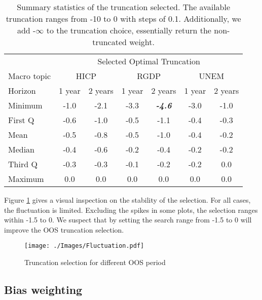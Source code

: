 \documentclass[11pt]{article}
\begin{document}
\begin{table}[!h]
\centering
\caption{Summary statistics of the truncation selected. The available truncation ranges from -10 to 0 with steps of 0.1. Additionally, we add -$\infty$ to the truncation choice, essentially return the non-truncated weight.}
\label{tab: truncation summary statistics}
\begin{tabular}{lcccccc}%
\hline
&\multicolumn{6}{c}{Selected Optimal Truncation}\\
\cmidrule(lr){2-7}
Macro topic & \multicolumn{2}{c}{HICP} & \multicolumn{2}{c}{RGDP} & \multicolumn{2}{c}{UNEM} \\
\cmidrule(lr){2-3} \cmidrule(lr){4-5}\cmidrule(lr){6-7}
Horizon     & 1 year & 2 years & 1 year & 2 years & 1 year & 2 years \\ 
\hline
Minimum     & -1.0        & -2.1        & -3.3        & \textbf{\emph{-4.6}}        & -3.0        & -1.0        \\
First Q     & -0.6        & -1.0        & -0.5        & -1.1        & -0.4        & -0.3        \\
Mean        & -0.5        & -0.8        & -0.5        & -1.0        & -0.4        & -0.2        \\
Median      & -0.4        & -0.6        & -0.2        & -0.4        & -0.2        & -0.2        \\
Third Q     & -0.3        & -0.3        & -0.1        & -0.2        & -0.2        & 0.0         \\
Maximum     & 0.0         & 0.0         & 0.0         & 0.0         & 0.0         & 0.0         \\ 
\hline
\end{tabular}
\end{table}

Figure \ref{fig: fluctuation} gives a visual inspection on the stability of the selection. For all cases, the fluctuation is limited. Excluding the spikes in some plots, the selection ranges within -1.5 to 0. We suspect that by setting the search range from -1.5 to 0 will improve the OOS truncation selection. 

\begin{figure}[!h]
	\centering
	\texttt{[image: ./Images/Fluctuation.pdf]}
	\caption{Truncation selection for different OOS period}\label{fig: fluctuation}
\end{figure}

\subsection{Bias weighting}\label{bias-weighting}
\end{document}
